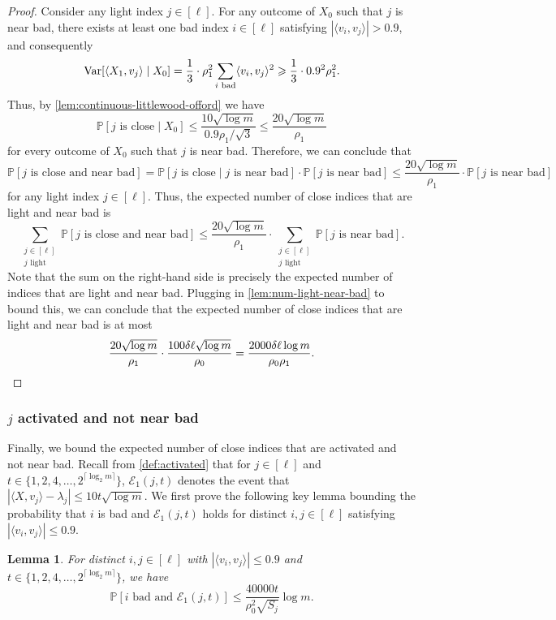 \documentclass[reqno]{amsart}
\newtheorem{lemma}[theorem]{Lemma}
\theoremstyle{remark}
\theoremstyle{definition}
\numberwithin{theorem}{section}
\renewcommand{\(}{\bigl(}
\renewcommand{\)}{\bigr)\vphantom{)}}
\newcommand{\cE}{\mathcal E}
\renewcommand{\le}{\leqslant}
\renewcommand{\ge}{\geqslant}
\renewcommand{\P}{\mathbb{P}}
\newcommand{\ceil}[1]{\lceil#1\rceil}
\newcommand{\ang}[1]{\langle#1\rangle}
\newcommand{\var}{\textup{Var}}
\begin{document}
\begin{proof}
Consider any light index $j\in [\ell]$. For any outcome of $X_0$ such that $j$ is near bad, there exists at least one bad index $i\in [\ell]$ satisfying $|\ang{v_i, v_j}| > 0.9$, and consequently
\[\var[\ang{X_1, v_j}\mid X_0] = \frac{1}{3}\cdot\rho_1^2\sum_{i\text{ bad}}\ang{v_i, v_j}^2\ge \frac{1}{3}\cdot 0.9^2\rho_1^2.\]
Thus, by \cref{lem:continuous-littlewood-offord} we have
 \[\P[j\text{ is close} \mid X_0]\le \frac{10\sqrt{\log m}}{0.9\rho_1/\sqrt{3}}\le \frac{20\sqrt{\log m}}{\rho_1}\]
 for every outcome of $X_0$ such that $j$ is near bad. Therefore, we can conclude that
 \[\P[j\text{ is close and near bad}]=\P[j\text{ is close}\mid j\text{ is near bad}]\cdot \P[j\text{ is near bad}]\le \frac{20\sqrt{\log m}}{\rho_1}\cdot \P[j\text{ is near bad}]\]
 for any light index $j\in [\ell]$. Thus, the expected number of close indices that are light and near bad is
 \[\sum_{\substack{j\in [\ell]\\j\text{ light}}}\P[j\text{ is close and near bad}]\le \frac{20\sqrt{\log m}}{\rho_1}\cdot \sum_{\substack{j\in [\ell]\\j\text{ light}}}\P[j\text{ is near bad}].\]
 Note that the sum on the right-hand side is precisely the expected number of indices that are light and near bad. Plugging in \cref{lem:num-light-near-bad} to bound this, we can conclude that the expected number of close indices that are light and near bad is at most
     \[\frac{20\sqrt{\log m}}{\rho_1}\cdot \frac{100\delta \ell\sqrt{\log m}}{\rho_0} = \frac{2000\delta \ell\log m}{\rho_0\rho_1}. \qedhere\]
\end{proof}


\subsubsection{$j$ activated and not near bad}

Finally, we bound the expected number of close indices that are activated and not near bad. Recall from \cref{def:activated} that for $j\in [\ell]$ and $t\in \{1,2,4,\dots,2^{\ceil{\log_2 m}}\}$, $\cE_1(j,t)$ denotes the event that $|\ang{X,v_j} - \lambda_j|\le 10t\sqrt{\log m}$. We first prove the following key lemma bounding the probability that $i$ is bad and $\cE_1(j,t)$ holds for distinct $i,j\in [\ell]$ satisfying $|\ang{v_i,v_j}|\le 0.9$.

\begin{lemma}\label{lem:almost-indep}
    For distinct $i,j\in [\ell]$ with $|\ang{v_i, v_j}|\le 0.9$ and $t\in \{1,2,4,\dots,2^{\ceil{\log_2 m}}\}$, we have 
    \[\P[i\text{ bad}\text{ and }\cE_1(j,t)]\le  \frac{40000t}{\rho_0^2\sqrt{S_j}}\log m.\]
\end{lemma}
    
\end{document}
